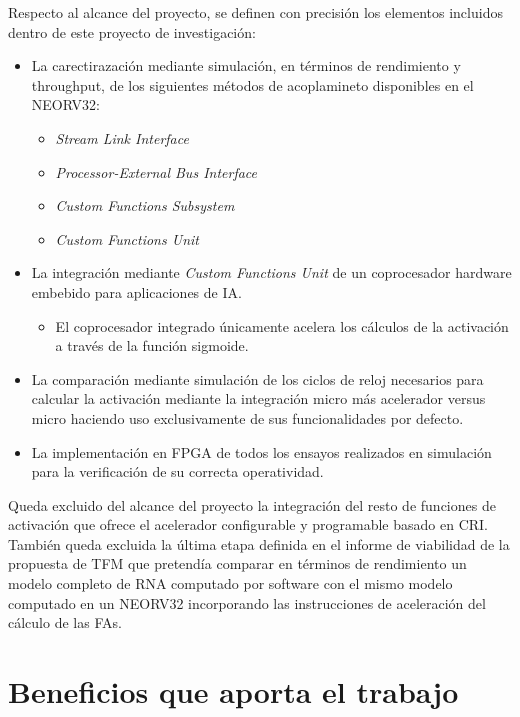Respecto al alcance del proyecto, se definen con precisión los elementos incluidos dentro de este proyecto de investigación: 

\begin{itemize}
    \item La carectirazación mediante simulación, en términos de rendimiento y throughput, de los siguientes métodos de acoplamineto disponibles en el NEORV32:
        \begin{itemize}
            \item \textit{Stream Link Interface}
            \item \textit{Processor-External Bus Interface} 
            \item \textit{Custom Functions Subsystem}
            \item \textit{Custom Functions Unit}
        \end{itemize} 
    \item La integración mediante \textit{Custom Functions Unit} de un coprocesador hardware embebido para aplicaciones de IA. 
        \begin{itemize}
            \item El coprocesador integrado únicamente acelera los cálculos de la activación a través de la función sigmoide.
        \end{itemize} 
    \item La comparación mediante simulación de los ciclos de reloj necesarios para calcular la activación mediante la integración micro más acelerador versus micro haciendo uso exclusivamente de sus funcionalidades por defecto.
    \item La implementación en FPGA de todos los ensayos realizados en simulación para la verificación de su correcta operatividad. 
\end{itemize} 

Queda excluido del alcance del proyecto la integración del resto de funciones de activación que ofrece el acelerador configurable y programable basado en CRI.
También queda excluida la última etapa definida en el informe de viabilidad de la propuesta de TFM que pretendía comparar en términos de rendimiento un modelo completo de RNA computado por software con el mismo modelo computado en un NEORV32 incorporando las instrucciones de aceleración del cálculo de las FAs.

\section{Beneficios que aporta el trabajo}

